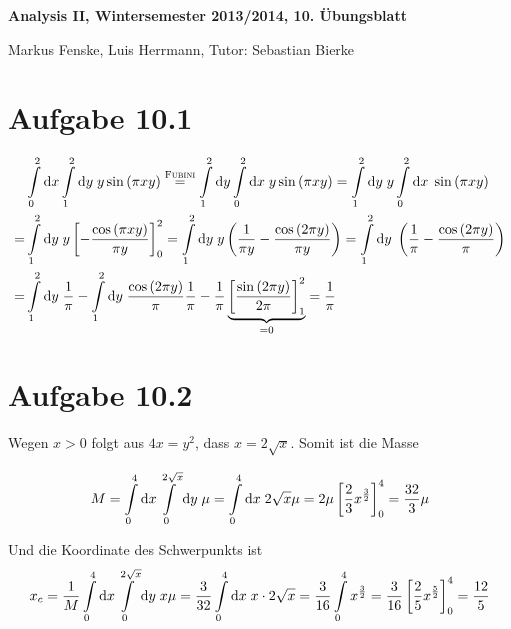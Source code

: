 \documentclass[a4paper,german,12pt,smallheadings]{scrartcl}
\begin{document}
\begin{center}
\bfseries %
\sffamily %
\vspace{-40pt}
Analysis II, Wintersemester 2013/2014, 10. Übungsblatt

Markus Fenske, Luis Herrmann, Tutor: Sebastian Bierke
\vspace{-10pt}
\end{center}
\allowdisplaybreaks %
\section*{Aufgabe 10.1}
\begin{align*}
  & \int\limits_0^2 \dif x \int\limits_1^2 \dif y \; y \sin\del{\pi x y} \overset{\text{\textsc{Fubini}}}{=}
    \int\limits_1^2 \dif y \int\limits_0^2 \dif x \; y \sin\del{\pi x y} =
    \int\limits_1^2 \dif y \; y \int\limits_0^2 \dif x \; \sin\del{\pi x y} \\ =
  & \int\limits_1^2 \dif y \; y \sbr{- \frac{\cos\del{\pi x y}}{\pi y}}_0^2 =
    \int\limits_1^2 \dif y \; y \del{\frac{1}{\pi y} - \frac{\cos\del{2 \pi y}}{\pi y}} =
    \int\limits_1^2 \dif y \; \del{\frac{1}{\pi} - \frac{\cos\del{2 \pi y}}{\pi}} \\ =
  & \int\limits_1^2 \dif y \; \frac{1}{\pi} - \int\limits_1^2 \dif y \; \frac{\cos\del{2 \pi y}}{\pi}
    \frac{1}{\pi} - \frac{1}{\pi} \underbrace{\sbr{\frac{\sin\del{2 \pi y}}{2 \pi}}_1^2}_{=0} = \frac{1}{\pi}
\end{align*}

\section*{Aufgabe 10.2}
Wegen $x > 0$ folgt aus $4x = y^2$, dass $x = 2 \sqrt{x}$. Somit ist die Masse

\begin{align*}
  M
  = \int\limits_0^4 \dif x \int\limits_0^{2 \sqrt{x}} \dif y \; \mu
  = \int\limits_0^4 \dif x \; 2 \sqrt{x} \mu
  = 2 \mu \sbr{\frac{2}{3} x^\frac{3}{2}}_0^4
  = \frac{32}{3} \mu
\end{align*}

Und die Koordinate des Schwerpunkts ist
\begin{align*}
  x_c 
  = \frac{1}{M} \int\limits_0^4 \dif x \int\limits_0^{2\sqrt{x}} \dif y \; x \mu
  = \frac{3}{32} \int\limits_0^4 \dif x \; x \cdot 2 \sqrt{x}
  = \frac{3}{16} \int\limits_0^4 x^\frac{3}{2}
  = \frac{3}{16} \sbr{\frac{2}{5} x^\frac{5}{2}}_0^4
  = \frac{12}{5}
\end{align*}
\end{document}
